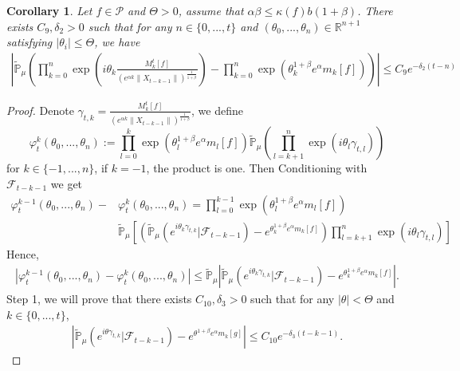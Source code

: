 \documentclass[12pt,oneside,english]{amsart}
\theoremstyle{plain}
\newtheorem{cor}[thm]{Corollary}
\theoremstyle{definition}
\numberwithin{equation}{section}
\begin{document}
\begin{cor}\label{corollary31}
Let $f\in \mathcal{P}$ and $\Theta>0$, assume that $\alpha\beta\leq\kappa(f)b(1+\beta)$. There exists $C_9,\delta_2>0$ such that for any $n \in \{0,...,t\}$ and $(\theta_0,...,\theta_n)\in \mathbb{R}^{n+1}$ satisfying $|\theta_i|\leq \Theta$, we have
\begin{align}
\label{32corollary}
    \left|\mathbb{\tilde{P}}_{\mu}\left(\prod_{k=0}^n\exp(i\theta_k \frac {M_k^t[f]}{(e^{\alpha k}\|X_{t-k-1}\|)^\frac{1}{1+\beta}})-\prod_{k=0}^n\exp(\theta_k^{1+\beta}e^{\alpha}m_k[f])\right)\right|\leq C_9 e^{-\delta_2(t-n)}
\end{align}
\end{cor}
\begin{proof}
    Denote $\gamma_{t,k}=\frac {M_k^t[f]}{(e^{\alpha k}\|X_{t-k-1}\|)^\frac{1}{1+\beta}} $, we define
    $$\varphi^k_t(\theta_0,...,\theta_n):=\prod_{l=0}^{k}\exp\left(\theta_l^{1+\beta}e^{\alpha}m_l[f]\right)\mathbb{\tilde{P}}_{\mu}\left(\prod_{l=k+1}^{n}\exp\left(i\theta_l\gamma_{t,l}\right)\right)$$
    for $k\in\{-1,...,n\}$, if $k=-1$, the product is one. Then Conditioning with $\mathcal{F}_{t-k-1}$ we get
    \begin{align*}
        \varphi^{k-1}_t(\theta_0,...,\theta_n)-&\varphi^{k}_t(\theta_0,...,\theta_n)=\prod_{l=0}^{k-1}\exp\left(\theta_l^{1+\beta}e^{\alpha}m_l[f]\right)\\
        &\mathbb{\tilde{P}}_{\mu}\left[\left(\mathbb{\tilde{P}}_{\mu}\left(e^{i\theta_k \gamma_{t,k}}|\mathcal{F}_{t-k-1}\right)-e^{\theta_k^{1+\beta}e^{\alpha}m_k[f]}\right)\prod_{l=k+1}^n\exp(i\theta_l \gamma_{t,l})\right]
    \end{align*}
    Hence,
    \begin{align*}
        \left|\varphi^{k-1}_t(\theta_0,...,\theta_n)-\varphi^{k}_t(\theta_0,...,\theta_n)\right| \leq \mathbb{\tilde{P}}_{\mu}\left|\mathbb{\tilde{P}}_{\mu}\left(e^{i\theta_k \gamma_{t,k}}|\mathcal{F}_{t-k-1}\right)-e^{\theta_k^{1+\beta}e^{\alpha}m_k[f]}\right|.
    \end{align*}
    Step 1, we will prove that there exists $C_{10},\delta_3>0$ such that for any $|\theta|<\Theta$ and $k\in \{0,...,t\}$,
    \begin{align}
    \label{eq:32step1}
        \left|\mathbb{\tilde{P}}_{\mu}\left(e^{i\theta \gamma_{t,k}}|\mathcal{F}_{t-k-1}\right)-e^{\theta^{1+\beta}e^{\alpha}m_k[g]}\right|\leq C_{10} e^{-\delta_3(t-k-1)}.
    \end{align}


\end{proof}
\end{document}
